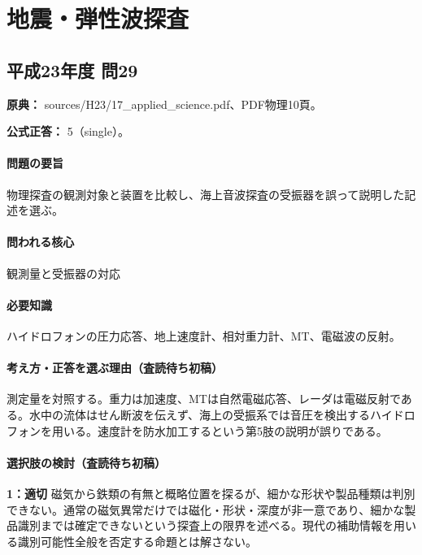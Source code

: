 \section{地震・弾性波探査}

\subsection{平成23年度 問29}
\label{q:h23-reg-applied-29}

\noindent\textbf{原典：} sources/H23/17\_applied\_science.pdf、PDF物理10頁。

\textbf{公式正答：} 5（single）。

\paragraph{問題の要旨} 物理探査の観測対象と装置を比較し、海上音波探査の受振器を誤って説明した記述を選ぶ。

\paragraph{問われる核心} 観測量と受振器の対応

\paragraph{必要知識} ハイドロフォンの圧力応答、地上速度計、相対重力計、MT、電磁波の反射。

\paragraph{考え方・正答を選ぶ理由（査読待ち初稿）} 測定量を対照する。重力は加速度、MTは自然電磁応答、レーダは電磁反射である。水中の流体はせん断波を伝えず、海上の受振系では音圧を検出するハイドロフォンを用いる。速度計を防水加工するという第5肢の説明が誤りである。

\paragraph{選択肢の検討（査読待ち初稿）}\mbox{}\par

\noindent\textbf{1：適切} 磁気から鉄類の有無と概略位置を探るが、細かな形状や製品種類は判別できない。通常の磁気異常だけでは磁化・形状・深度が非一意であり、細かな製品識別までは確定できないという探査上の限界を述べる。現代の補助情報を用いる識別可能性全般を否定する命題とは解さない。\par


